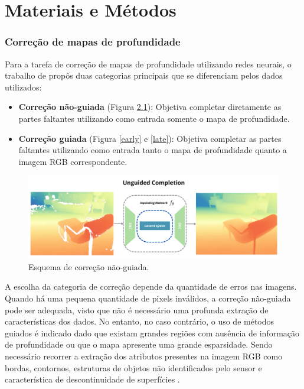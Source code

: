\section{}



\chapter{Materiais e Métodos}

\subsection{Correção de mapas de profundidade} 

Para a tarefa de correção de mapas de profundidade utilizando redes neurais, o trabalho de \cite{hu2022deep} propôs duas categorias principais que se diferenciam pelos dados utilizados:

\begin{itemize}
    \item \textbf{Correção não-guiada} (Figura \ref{ung}): Objetiva completar diretamente as partes faltantes utilizando como entrada somente o mapa de profundidade.
    \item \textbf{Correção guiada} (Figura \ref{early} e \ref{late}): Objetiva completar as partes faltantes utilizando como entrada tanto o mapa de profundidade quanto a imagem RGB correspondente.
\end{itemize}

\begin{figure}[h]
    \centering
    \includegraphics[width=\textwidth]{fig/unguided.png}
    \caption{Esquema de correção não-guiada.}
    \label{ung}
\end{figure}

A escolha da categoria de correção depende da quantidade de erros nas imagens. Quando há uma pequena quantidade de pixels inválidos, a correção não-guiada pode ser adequada, visto que não é necessário uma profunda extração de características dos dados. No entanto, no caso contrário, o uso de métodos guiados é indicado dado que existam grandes regiões com ausência de informação de profundidade ou que o mapa apresente uma grande esparsidade. Sendo necessário recorrer a extração dos atributos presentes na imagem RGB como bordas, contornos, estruturas de objetos não identificados pelo sensor e característica de descontinuidade de superfícies \cite{hu2022deep}.

